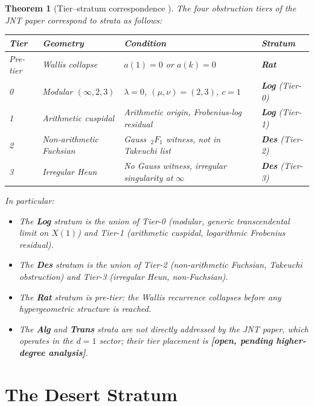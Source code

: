\documentclass[12pt]{amsart}
\newcommand{\PLACEHOLDER}[1]{{\color{red}\textbf{[#1]}}}
\newtheorem{theorem}{Theorem}[section]
\begin{document}
\begin{theorem}[Tier--stratum correspondence
  {\cite{Obstruction}}]
\label{thm:tiers}
The four obstruction tiers of the JNT paper
correspond to strata as follows:
\begin{center}
\renewcommand{\arraystretch}{1.3}
\begin{tabularx}{\textwidth}{llXl}
\hline
Tier & Geometry & Condition & Stratum \\
\hline
Pre-tier & Wallis collapse &
  $a(1)=0$ or $a(k)=0$ &
  \textbf{Rat} \\
0 & Modular $(\infty,2,3)$ &
  $\lambda=0$, $(\mu,\nu)=(2,3)$, $c=1$ &
  \textbf{Log} (Tier-0) \\
1 & Arithmetic cuspidal &
  Arithmetic origin, Frobenius-log residual &
  \textbf{Log} (Tier-1) \\
2 & Non-arithmetic Fuchsian &
  Gauss $\,_2F_1$ witness, not in
  Takeuchi list &
  \textbf{Des} (Tier-2) \\
3 & Irregular Heun &
  No Gauss witness, irregular
  singularity at $\infty$ &
  \textbf{Des} (Tier-3) \\
\hline
\end{tabularx}
\end{center}
In particular:
\begin{itemize}
\item The \textbf{Log} stratum is the union of
  Tier-0 (modular, generic transcendental limit
  on $X(1)$) and Tier-1 (arithmetic cuspidal,
  logarithmic Frobenius residual).
\item The \textbf{Des} stratum is the union of
  Tier-2 (non-arithmetic Fuchsian, Takeuchi
  obstruction) and Tier-3 (irregular Heun,
  non-Fuchsian).
\item The \textbf{Rat} stratum is pre-tier:
  the Wallis recurrence collapses before any
  hypergeometric structure is reached.
\item The \textbf{Alg} and \textbf{Trans}
  strata are not directly addressed by the
  JNT paper, which operates in the $d=1$
  sector; their tier placement is
  \PLACEHOLDER{open, pending higher-degree
  analysis}.
\end{itemize}
\end{theorem}

\section{The Desert Stratum}
\label{sec:desert}
\end{document}
